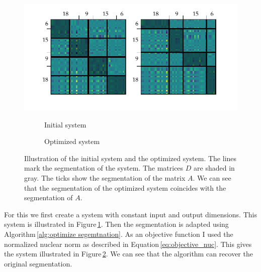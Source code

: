 \documentclass[doctype=mastersthesis,BCOR=15mm,biblatex]{ldvbook}%
\begin{document}
\begin{figure}[!htb]
	\centering
	\includegraphics[trim=0.4cm 0.9cm 0 0, clip,width=\textwidth]{Plots/example_move.pdf}
	\begin{subfigure}[b]{0.35\textwidth}
		\caption{Initial system}
		\label{fig:example_move_a}
	\end{subfigure}
	\hspace{0.8cm}
	\begin{subfigure}[b]{0.35\textwidth}
		\caption{Optimized system}
		\label{fig:example_move_b}
	\end{subfigure}
	\caption{Illustration of the initial system and the optimized system.
		The lines mark the segmentation of the system.
		The matrices $D$ are shaded in gray.
		The ticks show the segmentation of the matrix $A$. 
		We can see that the segmentation of the optimized system coincides with the segmentation of $A$.}
	\label{fig:example_move}
\end{figure}

For this we first create a system with constant input and output dimensions.
This system is illustrated in Figure\,\ref{fig:example_move_a}.
Then the segmentation is adapted using Algorithm\,\ref{alg:optimize segemtnation}.
As an objective function I used the normalized nuclear norm as described in Equation\,\ref{eq:objective_nuc}.
This gives the system illustrated in Figure\,\ref{fig:example_move_b}.
We can see that the algorithm can recover the original segmentation.
 
\end{document}

